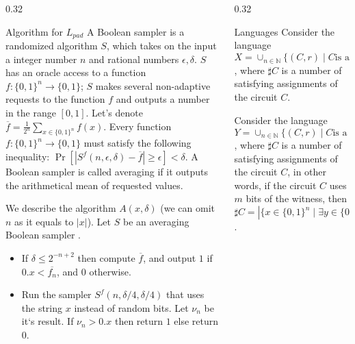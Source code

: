 \begin{frame}{}
\begin{columns}[t]
\begin{column}{0.32\linewidth}
        \begin{block}{Algorithm for $L_{pad}$}
            A Boolean sampler is a randomized algorithm $S$, which takes on the input
			a integer number $n$ and rational numbers $\epsilon, \delta$.  $S$ has an
            oracle access to a function $f:\{0,1\}^n \to \{0,1\}$; $S$ makes several
            non-adaptive requests to the function $f$ and outputs a number in the
            range $[0,1]$. Let's denote $\overline{f} =
            \frac{1}{2^n}\sum_{x \in \{0,1\}^n}f(x)$. Every function
            $f:\{0,1\}^n \to \{0,1\}$ must satisfy the following inequality: 
			$\Pr[|S^f(n,\epsilon,\delta)-\overline{f}|\ge \epsilon]<\delta$.  A
            Boolean sampler is called averaging if it outputs the arithmetical mean
            of requested values.

            We describe the algorithm $A(x,\delta)$  (we can omit $n$ as it equals to $|x|$).
			Let $S$ be an averaging Boolean sampler \cite{Gol11}.
            \begin{itemize}
				\item If $\delta \le 2^{-n+2}$ then compute $\overline{f}$, and
		            output $1$ if $0.x < \overline{f_n}$, and $0$ otherwise. 
				\item Run the sampler $S^f(n, \delta / 4, \delta / 4)$ that uses the
		            string $x$ instead of random bits.
					Let $\nu_n$ be it`s result. If $\nu_n> 0.x$ then return $1$ else
                    return $0$. 
			\end{itemize}
        \end{block}
        
    \end{column}%

    \begin{column}{0.32\linewidth}
        \begin{block}{Languages}
            Consider the language $X = \cup_{n \in \mathbb{N}}\{(C, r) \mid \mbox{$C$
            is a circuit with $n$ inputs}, r \in \{0, 1\}^n, \sharp C > r\}$, where
        	$\sharp C$ is a number of satisfying assignments of the circuit $C$. 

            Consider the language $Y = \cup_{n \in \mathbb{N}}\{(C,r) \mid \mbox{$C$
            is a non-deterministic circuit with $n$ inputs}, r \in \{0, 1\}^n, \sharp
          	C > r\}$, where $\sharp C$ is a number of satisfying assignments of the
            circuit $C$, in other words, if the circuit $C$ uses $m$ bits of the
            witness, then $\sharp C = |\{x \in \{0,1\}^n \mid \exists y \in
            \{0,1\}^m: C(x,y) = 1\}|$.
        \end{block}


\end{column}
\end{columns}
\end{frame}
